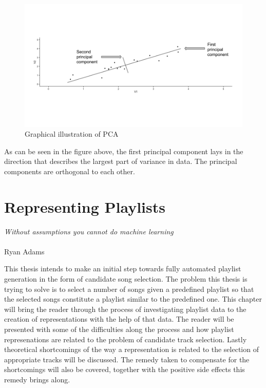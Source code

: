 \documentclass[a4paper,11pt]{kth-mag}
\begin{document}
\begin{figure}
\includegraphics[scale=0.42]{images/pca.png}
\caption{Graphical illustration of PCA}
\end{figure}


As can be seen in the figure above, the first principal component lays in the direction that describes the largest part of variance in data. The principal components are orthogonal to each other. 

\chapter{Representing Playlists}
\begin{displayquote}
\textit{Without assumptions you cannot do machine learning} \\\\Ryan Adams
\end{displayquote}

This thesis intends to make an initial step towards fully automated playlist generation in the form of candidate song selection. The problem this thesis is trying to solve is to select a number of songs given a predefined playlist so that the selected songs constitute a playlist similar to the predefined one. This chapter will bring the reader through the process of investigating playlist data to the creation of representations with the help of that data. The reader will  be presented with some of the difficulties along the process and how playlist represenations are related to the problem of candidate track selection. Lastly theoretical shortcomings of the way a representation is related to the selection of appropriate tracks will be discussed. The remedy taken to compensate for the shortcomings will also be covered, together with the positive side effects this remedy brings along.
\end{document}
